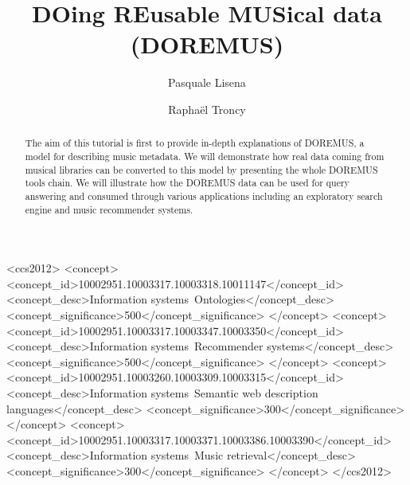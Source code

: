 \documentclass[sigconf]{acmart}
\begin{document}
\title{{DO}ing {RE}usable {MUS}ical data ({DOREMUS})}

\author{Pasquale Lisena}

\author{Rapha\"el Troncy}

\renewcommand{\shortauthors}{P. Lisena et R. Troncy}


\begin{abstract}
The aim of this tutorial is first to provide in-depth explanations of DOREMUS, a model for describing music metadata. We will demonstrate how real data coming from musical libraries can be converted to this model by presenting the whole DOREMUS tools chain.
We will illustrate how the DOREMUS data can be used for query answering and consumed through various applications including an exploratory search engine and music recommender systems.
\end{abstract}

%
%
\begin{CCSXML}
<ccs2012>
<concept>
<concept_id>10002951.10003317.10003318.10011147</concept_id>
<concept_desc>Information systems~Ontologies</concept_desc>
<concept_significance>500</concept_significance>
</concept>
<concept>
<concept_id>10002951.10003317.10003347.10003350</concept_id>
<concept_desc>Information systems~Recommender systems</concept_desc>
<concept_significance>500</concept_significance>
</concept>
<concept>
<concept_id>10002951.10003260.10003309.10003315</concept_id>
<concept_desc>Information systems~Semantic web description languages</concept_desc>
<concept_significance>300</concept_significance>
</concept>
<concept>
<concept_id>10002951.10003317.10003371.10003386.10003390</concept_id>
<concept_desc>Information systems~Music retrieval</concept_desc>
<concept_significance>300</concept_significance>
</concept>
</ccs2012>
\end{CCSXML}




\maketitle




 
\end{document}
